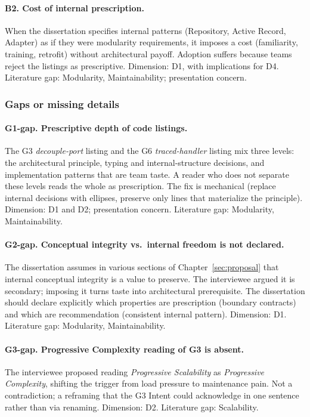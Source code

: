 \paragraph*{B2. Cost of internal prescription.} When the dissertation specifies internal patterns (Repository, Active Record, Adapter) as if they were modularity requirements, it imposes a cost (familiarity, training, retrofit) without architectural payoff. Adoption suffers because teams reject the listings as prescriptive. Dimension: D1, with implications for D4. Literature gap: Modularity, Maintainability; presentation concern.

\subsubsection*{Gaps or missing details}

\paragraph*{G1-gap. Prescriptive depth of code listings.} The G3 \emph{decouple-port} listing and the G6 \emph{traced-handler} listing mix three levels: the architectural principle, typing and internal-structure decisions, and implementation patterns that are team taste. A reader who does not separate these levels reads the whole as prescription. The fix is mechanical (replace internal decisions with ellipses, preserve only lines that materialize the principle). Dimension: D1 and D2; presentation concern. Literature gap: Modularity, Maintainability.

\paragraph*{G2-gap. Conceptual integrity vs.\ internal freedom is not declared.} The dissertation assumes in various sections of Chapter~\ref{sec:proposal} that internal conceptual integrity is a value to preserve. The interviewee argued it is secondary; imposing it turns taste into architectural prerequisite. The dissertation should declare explicitly which properties are prescription (boundary contracts) and which are recommendation (consistent internal pattern). Dimension: D1. Literature gap: Modularity, Maintainability.

\paragraph*{G3-gap. Progressive Complexity reading of G3 is absent.} The interviewee proposed reading \emph{Progressive Scalability} as \emph{Progressive Complexity}, shifting the trigger from load pressure to maintenance pain. Not a contradiction; a reframing that the G3 Intent could acknowledge in one sentence rather than via renaming. Dimension: D2. Literature gap: Scalability.

